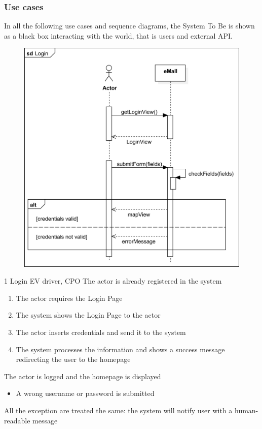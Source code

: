 \pagebreak

\subsubsection{Use cases}
In all the following use cases and sequence diagrams, the System To Be is shown as a black box interacting with the world, that is users and external API.
\usecase
{
    \begin{figure}[H]
        \centering
        \includegraphics[scale=0.9]{src/sequence_diagram/login.png}
    \end{figure}
}
{1}
{Login}
{EV driver, CPO}
{The actor is already registered in the system}
{
    \begin{enumerate}
        \item The actor requires the Login Page
        \item The system shows the Login Page to the actor
        \item The actor inserts credentials and send it to the system
        \item The system processes the information and shows a success message redirecting the user to the homepage
    \end{enumerate}
}
{The actor is logged and the homepage is displayed}
{
    \begin{itemize}
        \item A wrong username or password is submitted
    \end{itemize}
}
{
    All the exception are treated the same: the system will notify user with a human-readable message
}

